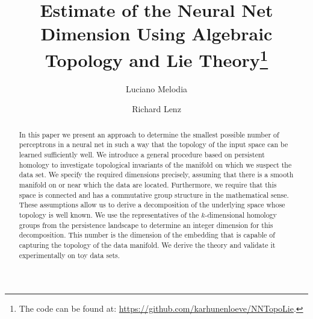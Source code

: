 \documentclass[runningheads,orivec]{llncs}
\begin{document}
%
\title{Estimate of the Neural Net Dimension Using Algebraic Topology and Lie Theory\thanks{The code can be found at: \href{https://github.com/karhunenloeve/NNTopoLie}{https://github.com/karhunenloeve/NNTopoLie}.}}
%
%

\author{Luciano Melodia \\
\and Richard Lenz}
%
%
%
\maketitle              %
%
\begin{abstract}
In this paper we present an approach to determine the smallest possible number of perceptrons in a neural net in such a way that the topology of the input space can be learned sufficiently well. We introduce a general procedure based on persistent homology to investigate topological invariants of the manifold on which we suspect the data set. We specify the required dimensions precisely, assuming that there is a smooth manifold on or near which the data are located. Furthermore, we require that this space is connected and has a commutative group structure in the mathematical sense. These assumptions allow us to derive a decomposition of the underlying space whose topology is well known. We use the representatives of the $k$-dimensional homology groups from the persistence landscape to determine an integer dimension for this decomposition. This number is the dimension of the embedding that is capable of capturing the topology of the data manifold. We derive the theory and validate it experimentally on toy data sets. 

\end{abstract}
\end{document}
